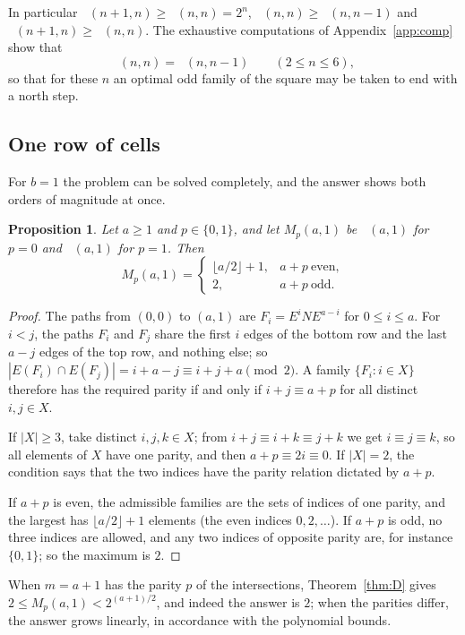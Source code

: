 \documentclass[11pt]{amsart}
\newtheorem{proposition}[theorem]{Proposition}
\theoremstyle{definition}
\theoremstyle{remark}
\numberwithin{equation}{section}
\DeclareMathOperator{\Meven}{M_{ev}}
\DeclareMathOperator{\Modd}{M_{od}}
\begin{document}
In particular $\Modd(n+1,n)\ge\Meven(n,n)=2^n$, $\Modd(n,n)\ge\Meven(n,n-1)$ and $\Meven(n+1,n)\ge\Modd(n,n)$. The exhaustive computations of Appendix~\ref{app:comp} show that
\begin{equation}\label{eq:transferobs}
\Modd(n,n)=\Meven(n,n-1)\qquad(2\le n\le 6),
\end{equation}
so that for these $n$ an optimal odd family of the square may be taken to end with a north step.

\subsection{One row of cells}

For $b=1$ the problem can be solved completely, and the answer shows both orders of magnitude at once.

\begin{proposition}\label{prop:onerow}
Let $a\ge1$ and $p\in\{0,1\}$, and let $M_p(a,1)$ be $\Meven(a,1)$ for $p=0$ and $\Modd(a,1)$ for $p=1$. Then
\[
M_p(a,1)=\begin{cases}\lfloor a/2\rfloor+1,& a+p\ \text{even},\\ 2,& a+p\ \text{odd}.\end{cases}
\]
\end{proposition}

\begin{proof}
The paths from $(0,0)$ to $(a,1)$ are $F_i=E^iNE^{a-i}$ for $0\le i\le a$. For $i<j$, the paths $F_i$ and $F_j$ share the first $i$ edges of the bottom row and the last $a-j$ edges of the top row, and nothing else; so $|E(F_i)\cap E(F_j)|=i+a-j\equiv i+j+a\pmod2$. A family $\{F_i:i\in X\}$ therefore has the required parity if and only if $i+j\equiv a+p$ for all distinct $i,j\in X$.

If $|X|\ge3$, take distinct $i,j,k\in X$; from $i+j\equiv i+k\equiv j+k$ we get $i\equiv j\equiv k$, so all elements of $X$ have one parity, and then $a+p\equiv 2i\equiv0$. If $|X|=2$, the condition says that the two indices have the parity relation dictated by $a+p$.

If $a+p$ is even, the admissible families are the sets of indices of one parity, and the largest has $\lfloor a/2\rfloor+1$ elements (the even indices $0,2,\dots$). If $a+p$ is odd, no three indices are allowed, and any two indices of opposite parity are, for instance $\{0,1\}$; so the maximum is $2$.
\end{proof}

When $m=a+1$ has the parity $p$ of the intersections, Theorem~\ref{thm:D} gives $2\le M_p(a,1)<2^{(a+1)/2}$, and indeed the answer is $2$; when the parities differ, the answer grows linearly, in accordance with the polynomial bounds.
\end{document}
